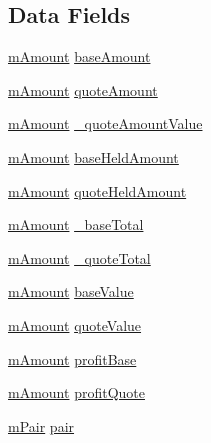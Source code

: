 \subsection*{Data Fields}
\begin{DoxyCompactItemize}
\item 
\hyperlink{km_8h_ad4d00888c55a47a8a40ed8020d176086}{m\+Amount} \hyperlink{struct_k_1_1m_position_a54ab63754ed59e0f7167d5b41d320e40}{base\+Amount}
\item 
\hyperlink{km_8h_ad4d00888c55a47a8a40ed8020d176086}{m\+Amount} \hyperlink{struct_k_1_1m_position_acff2752d5a4e300b20b82133fab1f501}{quote\+Amount}
\item 
\hyperlink{km_8h_ad4d00888c55a47a8a40ed8020d176086}{m\+Amount} \hyperlink{struct_k_1_1m_position_a066ad2fbc6cce3f254d147da5255eae7}{\+\_\+quote\+Amount\+Value}
\item 
\hyperlink{km_8h_ad4d00888c55a47a8a40ed8020d176086}{m\+Amount} \hyperlink{struct_k_1_1m_position_ac6175d7078a5d215338188838dba1800}{base\+Held\+Amount}
\item 
\hyperlink{km_8h_ad4d00888c55a47a8a40ed8020d176086}{m\+Amount} \hyperlink{struct_k_1_1m_position_aca53b8b74d1f770cfb029ec8dd3df4d9}{quote\+Held\+Amount}
\item 
\hyperlink{km_8h_ad4d00888c55a47a8a40ed8020d176086}{m\+Amount} \hyperlink{struct_k_1_1m_position_ab965b19b8d97ea6e0f46d38308479a70}{\+\_\+base\+Total}
\item 
\hyperlink{km_8h_ad4d00888c55a47a8a40ed8020d176086}{m\+Amount} \hyperlink{struct_k_1_1m_position_aba337b0148ad9e78db4325d42f9852eb}{\+\_\+quote\+Total}
\item 
\hyperlink{km_8h_ad4d00888c55a47a8a40ed8020d176086}{m\+Amount} \hyperlink{struct_k_1_1m_position_adbb3d8b288708abaf509a644671fb442}{base\+Value}
\item 
\hyperlink{km_8h_ad4d00888c55a47a8a40ed8020d176086}{m\+Amount} \hyperlink{struct_k_1_1m_position_aa18e1bafbe0751bf4ba417df1da264d9}{quote\+Value}
\item 
\hyperlink{km_8h_ad4d00888c55a47a8a40ed8020d176086}{m\+Amount} \hyperlink{struct_k_1_1m_position_ab91bb0250c8c19834e1ffb19c558b706}{profit\+Base}
\item 
\hyperlink{km_8h_ad4d00888c55a47a8a40ed8020d176086}{m\+Amount} \hyperlink{struct_k_1_1m_position_af61cbd1fb2428e9e2ee95e046f8ef327}{profit\+Quote}
\item 
\hyperlink{struct_k_1_1m_pair}{m\+Pair} \hyperlink{struct_k_1_1m_position_a11dec7b102d6df830347649bfbf35399}{pair}
\end{DoxyCompactItemize}


